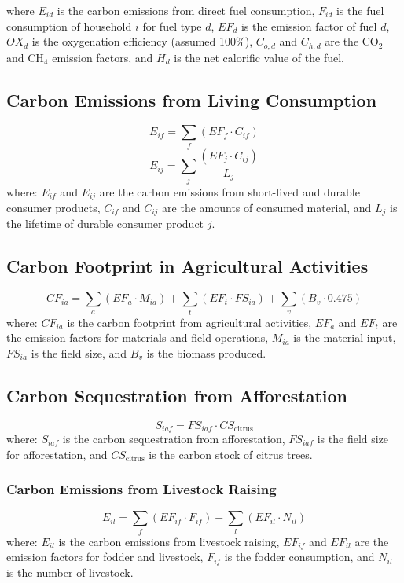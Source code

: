 \documentclass[12pt,a4paper]{article}%
\begin{document}
where $E_{id}$ is the carbon emissions from direct fuel consumption, $F_{id}$ is the fuel consumption of household $i$ for fuel type $d$, $EF_d$ is the emission factor of fuel $d$, $OX_d$ is the oxygenation efficiency (assumed 100\%), $C_{o,d}$ and $C_{h,d}$ are the CO$_2$ and CH$_4$ emission factors, and $H_d$ is the net calorific value of the fuel.


\subsection{Carbon Emissions from Living Consumption}
\begin{equation}
E_{if} = \sum_f (EF_f \cdot C_{if})
\end{equation}
\begin{equation}
E_{ij} = \sum_j \frac{(EF_j \cdot C_{ij})}{L_j}
\end{equation}
where: $E_{if}$ and $E_{ij}$ are the carbon emissions from short-lived and durable consumer products, $C_{if}$ and $C_{ij}$ are the amounts of consumed material, and $L_j$ is the lifetime of durable consumer product $j$.


\subsection{Carbon Footprint in Agricultural Activities}
\begin{equation}
CF_{ia} = \sum_a (EF_a \cdot M_{ia}) + \sum_t (EF_t \cdot FS_{ia}) + \sum_v (B_v \cdot 0.475)
\end{equation}
where: $CF_{ia}$ is the carbon footprint from agricultural activities, $EF_a$ and $EF_t$ are the emission factors for materials and field operations, $M_{ia}$ is the material input, $FS_{ia}$ is the field size, and $B_v$ is the biomass produced.


\subsection{Carbon Sequestration from Afforestation}
\begin{equation}
S_{iaf} = FS_{iaf} \cdot CS_{\text{citrus}}
\end{equation}
where: $S_{iaf}$ is the carbon sequestration from afforestation, $FS_{iaf}$ is the field size for afforestation, and $CS_{\text{citrus}}$ is the carbon stock of citrus trees.


\subsubsection{Carbon Emissions from Livestock Raising}
\begin{equation}
E_{il} = \sum_f (EF_{if} \cdot F_{if}) + \sum_l (EF_{il} \cdot N_{il})
\end{equation}
where: $E_{il}$ is the carbon emissions from livestock raising, $EF_{if}$ and $EF_{il}$ are the emission factors for fodder and livestock, $F_{if}$ is the fodder consumption, and $N_{il}$ is the number of livestock.
\end{document}
